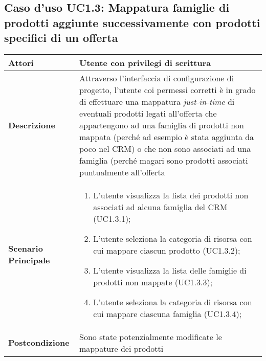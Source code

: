 	\subsection{Caso d'uso UC1.3: Mappatura famiglie di prodotti aggiunte successivamente con prodotti specifici di un offerta}
	\begin{longtable}{ | p{2.7cm} | p{12cm} |}
		\hline \textbf{Attori} & Utente con privilegi di scrittura\\ 
		\hline \textbf{Descrizione} & Attraverso l’interfaccia di configurazione di progetto, l’utente coi permessi corretti è in grado di effettuare una mappatura \textit{just-in-time} di eventuali prodotti legati all’offerta che appartengono ad una famiglia di prodotti non mappata (perché ad esempio è stata aggiunta da poco nel CRM) o che non sono associati ad una famiglia (perché magari sono prodotti associati puntualmente all’offerta\\ 
		\hline \textbf{Scenario Principale} & \begin{enumerate}
			\item L’utente visualizza la lista dei prodotti non associati ad alcuna famiglia del CRM  (UC1.3.1);
			\item L’utente seleziona la categoria di risorsa con cui mappare ciascun prodotto  (UC1.3.2);
			\item L’utente visualizza la lista delle famiglie di prodotti non mappate  (UC1.3.3);
			\item L’utente seleziona la categoria di risorsa con cui mappare ciascuna famiglia  (UC1.3.4);
			
		\end{enumerate}
		\\ 
		\hline \textbf{Postcondizione} & Sono state potenzialmente modificate le mappature dei prodotti\\ 
		\hline 
	\end{longtable}
	
	\hypertarget{UC2}{}

